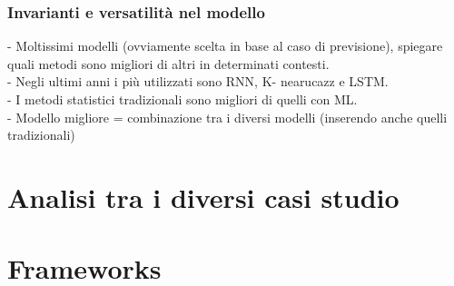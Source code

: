 \documentclass[12pt,a4paper]{report}
\begin{document}
\subsection{Invarianti e versatilità nel modello}
-	Moltissimi modelli (ovviamente scelta in base al caso di previsione), spiegare quali metodi sono migliori di altri in determinati contesti.\\
-	Negli ultimi anni i più utilizzati sono RNN, K- nearucazz e LSTM.\\
-	I metodi statistici tradizionali sono migliori di quelli con ML.\\
-	Modello migliore = combinazione tra i diversi modelli (inserendo anche quelli tradizionali)\\


\chapter{Analisi tra i diversi casi studio}

\chapter{Frameworks}
\end{document}
